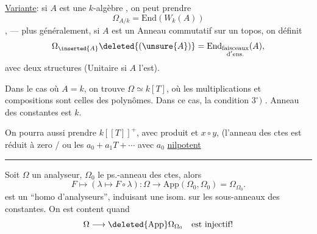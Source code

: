 \uline{Variante}: si $A$ est une $k$-algèbre , on peut prendre
\[
\Omega_{A/k}=\mathrm{End}(W_k(A))
\]
,
--- plus généralement, si $A$ est un Anneau commutatif sur un topos, on définit
\[
\Omega_{\inserted{A}}\deleted{(\unsure{A})}
=\mathrm{End}_{\substack{\mathrm{faisceaux}\\\mathrm{d'ens.}}}(A),
\]
avec deux structures  
(Unitaire si $A$ l'est).

Dans le cas où $A=k$, on trouve $\Omega\simeq k[T]$, où les  multiplications et compositions sont celles des polynômes.
Dans ce cas, la condition $3^\circ)$ .
Anneau des constantes est $k$.

On pourra aussi prendre $k[[T]]^+$, avec produit et $x\circ y$,
(l'anneau des ctes est réduit à zero / ou les $a_0+a_1T+\cdots$ avec $a_0$ \uline{nilpotent}

\hrule
Soit $\Omega$ un analyseur, $\Omega_0$ le ps.-anneau des ctes, alors
\[
F\longmapsto(\lambda\longmapsto F\circ\lambda):
\Omega\longrightarrow\mathrm{App}(\Omega_0,\Omega_0)=\Omega_{\Omega_0}.
\]
est un ``homo d'analyseurs'', induisant une isom. sur les sous-anneaux des constantes.
On est content quand
\[
\Omega\longrightarrow\deleted{\mathrm{App}}\Omega_{\Omega_0}
\quad\text{est injectif!}
\]


